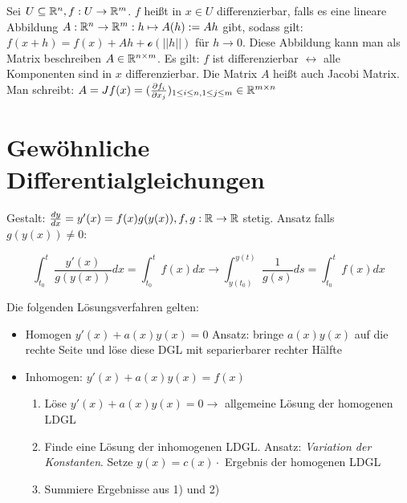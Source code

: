 \begin{definition}
	Sei $U \subseteq \mathbb{R}^n, f : U \rightarrow \mathbb{R}^m$. $f$ heißt in $x \in U $ differenzierbar, falls es eine lineare Abbildung $A : \mathbb{R}^n \rightarrow \mathbb{R}^m : h \mapsto A(h) := Ah$ gibt, sodass gilt: $f(x+h) = f(x) + Ah + \mathcal{o}(||h||)$ für $h \rightarrow 0$. Diese Abbildung kann man als Matrix beschreiben $A \in \mathbb{R}^{n \times m}$. Es gilt: $f$ ist differenzierbar $\leftrightarrow$ alle Komponenten sind in $x$ differenzierbar.
	Die Matrix $A$ heißt auch Jacobi Matrix. Man schreibt:
	$A = Jf(x) = (\frac{\partial f_i}{\partial x_j})_{1 \leq i \leq n, 1 \leq j \leq m} \in \mathbb{R}^{m \times n }$
\end{definition}

\pagebreak

\section{Gewöhnliche Differentialgleichungen}
\begin{definition}
	
	Gestalt: $\frac{d y}{d x} = y'(x) = f(x)g(y(x)), f,g : \mathbb{R} \rightarrow \mathbb{R}$ stetig. Ansatz falls $g(y(x)) \neq 0$:
	
	\begin{equation*}
		\int_{t_0}^{t} \frac{y'(x)}{g(y(x))} dx = \int_{t_0}^{t} f(x) dx \rightarrow \int_{y(t_0)}^{y(t)} \frac{1}{g(s)} ds = \int_{t_0}^{t} f(x) dx
	\end{equation*}
\end{definition}

\begin{definition}
	Die folgenden Lösungsverfahren gelten:
	\begin{itemize}
		\item Homogen $y'(x) + a(x)y(x) = 0$ Ansatz: bringe $a(x)y(x)$ auf die rechte Seite und löse diese DGL mit separierbarer rechter Hälfte
		\item Inhomogen: $y'(x) + a(x)y(x) = f(x)$ 
			\begin{enumerate} [noitemsep]
				\item Löse $y'(x) +a(x)y(x) = 0 \rightarrow $ allgemeine Lösung der homogenen LDGL
				\item Finde eine Lösung der inhomogenen LDGL. Ansatz: \emph{Variation der Konstanten}. Setze $y(x) = c(x) \cdot$ Ergebnis der homogenen LDGL
				\item Summiere Ergebnisse aus 1) und 2)
			\end{enumerate}
	\end{itemize}
\end{definition}

